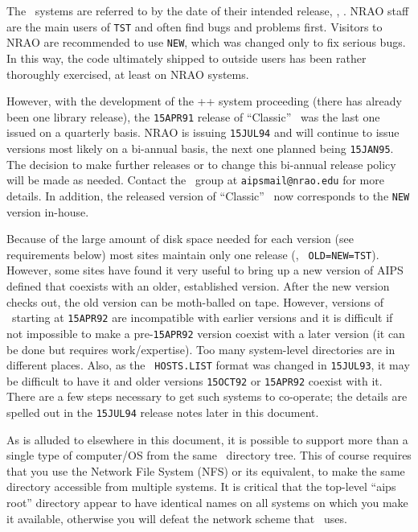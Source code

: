 The \AIPS\ systems are referred to by the date of their intended release,
\eg, {\tt \thisver}.  NRAO staff are the main users of {\tt TST} and often
find bugs and problems first.  Visitors to NRAO are recommended to use
{\tt NEW}, which was changed only to fix serious bugs.  In this way, the
code ultimately shipped to outside users has been rather thoroughly
exercised, at least on NRAO systems.

However, with the development of the \AIPS++ system proceeding (there has
already been one library release), the {\tt 15APR91} release of
``Classic'' \AIPS\ was the last one issued on a quarterly basis.  NRAO is
issuing {\tt 15JUL94} and will continue to issue versions most likely on a
bi-annual basis, the next one planned being {\tt 15JAN95}.  The decision
to make further releases or to change this bi-annual release policy will
be made as needed.  Contact the \aips\ group at {\tt aipsmail@nrao.edu}
for more details.
In addition, the released version of ``Classic'' \AIPS\ now corresponds
to the {\tt NEW} version in-house.

Because of the large amount of disk space needed for each version (see
requirements below) most sites maintain only one release (\ie, {\tt
OLD=NEW=TST}).  However, some sites have found it very useful to bring up
a new version of AIPS defined that coexists with an older, established
version.  After the new version checks out, the old version can be
moth-balled on tape.  However, versions of \AIPS\ starting at {\tt 15APR92}
are incompatible with earlier versions and it is difficult if not
impossible to make a pre-{\tt 15APR92} version coexist with a later
version (it can be done but requires work/expertise).  Too many
system-level directories are in different places.  Also, as the {\tt
HOSTS.LIST} format was changed in {\tt 15JUL93}, it may be difficult to
have it and older versions {\tt 15OCT92} or {\tt 15APR92} coexist with it.
There are a few steps necessary to get such systems to co-operate; the
details are spelled out in the {\tt 15JUL94} release notes later in this
document.

\medskip{}

As is alluded to elsewhere in this document, it is possible to support
more than a single type of computer/OS from the same \AIPS\ directory
tree.  This of course requires that you use the Network File System (NFS)
or its equivalent, to make the same directory accessible from multiple
systems.  It is critical that the top-level ``aips root'' directory appear
to have identical names on all systems on which you make it available,
otherwise you will defeat the network scheme that \AIPS\ uses.

